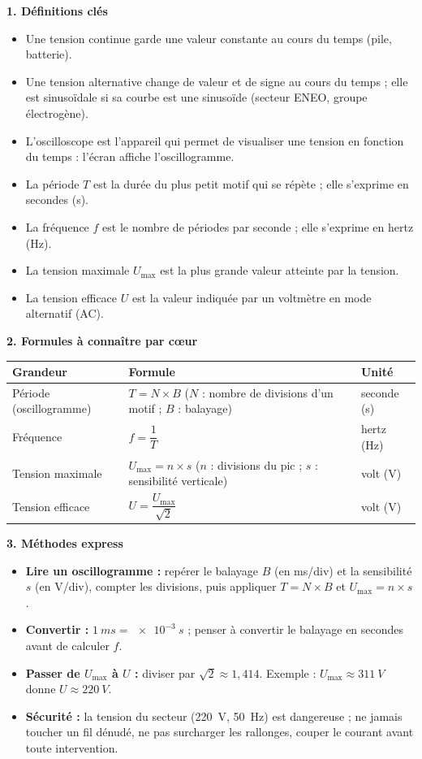 \documentclass[11pt]{article}
\newcommand{\cle}[1]{{\popxbold\color{popdark}#1}}
\begin{document}
\begin{bilan}
\textbf{1. Définitions clés}
\begin{itemize}
\item Une \cle{tension continue} garde une valeur constante au cours du temps (pile, batterie).
\item Une \cle{tension alternative} change de valeur et de signe au cours du temps ; elle est \cle{sinusoïdale} si sa courbe est une sinusoïde (secteur ENEO, groupe électrogène).
\item L'\cle{oscilloscope} est l'appareil qui permet de visualiser une tension en fonction du temps : l'écran affiche l'\cle{oscillogramme}.
\item La \cle{période} $T$ est la durée du plus petit motif qui se répète ; elle s'exprime en secondes (s).
\item La \cle{fréquence} $f$ est le nombre de périodes par seconde ; elle s'exprime en hertz (Hz).
\item La \cle{tension maximale} $U_{\max}$ est la plus grande valeur atteinte par la tension.
\item La \cle{tension efficace} $U$ est la valeur indiquée par un voltmètre en mode alternatif (AC).
\end{itemize}

\textbf{2. Formules à connaître par cœur}
\begin{center}
\begin{tabularx}{\linewidth}{|l|X|l|}\hline
\rowcolor{popblueL} \textbf{Grandeur} & \textbf{Formule} & \textbf{Unité} \\ \hline
Période (oscillogramme) & $T = N \times B$ ($N$ : nombre de divisions d'un motif ; $B$ : balayage) & seconde (s) \\ \hline
Fréquence & $f = \dfrac{1}{T}$ & hertz (Hz) \\ \hline
Tension maximale & $U_{\max} = n \times s$ ($n$ : divisions du pic ; $s$ : sensibilité verticale) & volt (V) \\ \hline
Tension efficace & $U = \dfrac{U_{\max}}{\sqrt{2}}$ & volt (V) \\ \hline
\end{tabularx}
\end{center}

\textbf{3. Méthodes express}
\begin{itemize}
\item \textbf{Lire un oscillogramme :} repérer le balayage $B$ (en ms/div) et la sensibilité $s$ (en V/div), compter les divisions, puis appliquer $T = N \times B$ et $U_{\max} = n \times s$.
\item \textbf{Convertir :} $\SI{1}{ms} = \SI{e-3}{s}$ ; penser à convertir le balayage en secondes avant de calculer $f$.
\item \textbf{Passer de $U_{\max}$ à $U$ :} diviser par $\sqrt{2} \approx 1{,}414$. Exemple : $U_{\max} \approx \SI{311}{V}$ donne $U \approx \SI{220}{V}$.
\item \textbf{Sécurité :} la tension du secteur (\SI{220}{V}, \SI{50}{Hz}) est dangereuse ; ne jamais toucher un fil dénudé, ne pas surcharger les rallonges, couper le courant avant toute intervention.
\end{itemize}
\end{bilan}
\end{document}
